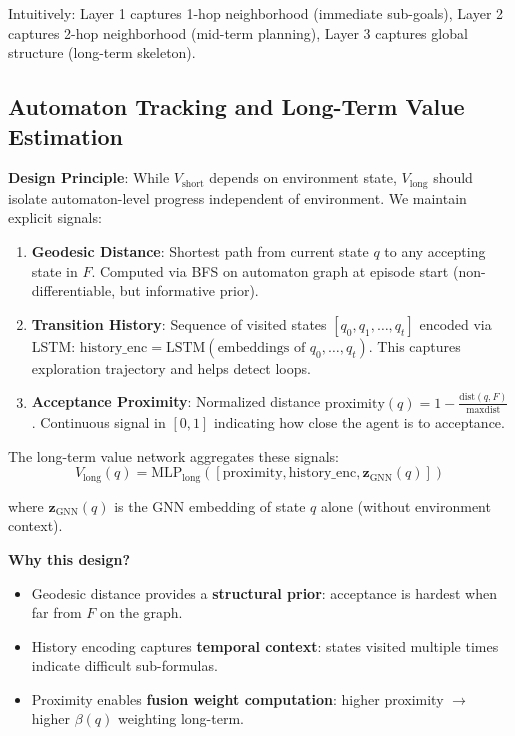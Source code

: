 \documentclass[conference]{IEEEtran}
\begin{document}
Intuitively: Layer 1 captures 1-hop neighborhood (immediate sub-goals), Layer 2 captures 2-hop neighborhood (mid-term planning), Layer 3 captures global structure (long-term skeleton).

\subsection{Automaton Tracking and Long-Term Value Estimation}

\textbf{Design Principle}: While $V_{\text{short}}$ depends on environment state, $V_{\text{long}}$ should isolate automaton-level progress independent of environment. We maintain explicit signals:

\begin{enumerate}
    \item \textbf{Geodesic Distance}: Shortest path from current state $q$ to any accepting state in $F$. Computed via BFS on automaton graph at episode start (non-differentiable, but informative prior).
    \item \textbf{Transition History}: Sequence of visited states $[q_0, q_1, \ldots, q_t]$ encoded via LSTM: $\text{history\_enc} = \text{LSTM}(\text{embeddings of } q_0, \ldots, q_t)$. This captures exploration trajectory and helps detect loops.
    \item \textbf{Acceptance Proximity}: Normalized distance $\text{proximity}(q) = 1 - \frac{\text{dist}(q, F)}{\max \text{dist}}$. Continuous signal in $[0, 1]$ indicating how close the agent is to acceptance.
\end{enumerate}

The long-term value network aggregates these signals:
\begin{equation}
V_{\text{long}}(q) = \text{MLP}_{\text{long}}([\text{proximity}, \text{history\_enc}, \mathbf{z}_{\text{GNN}}(q)])
\end{equation}

where $\mathbf{z}_{\text{GNN}}(q)$ is the GNN embedding of state $q$ alone (without environment context).

\textbf{Why this design?}
\begin{itemize}
    \item Geodesic distance provides a \textbf{structural prior}: acceptance is hardest when far from $F$ on the graph.
    \item History encoding captures \textbf{temporal context}: states visited multiple times indicate difficult sub-formulas.
    \item Proximity enables \textbf{fusion weight computation}: higher proximity $\rightarrow$ higher $\beta(q)$ weighting long-term.
\end{itemize}
\end{document}
